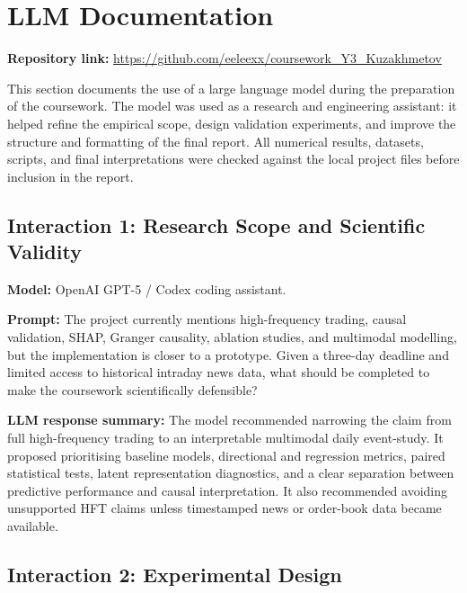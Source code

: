 \documentclass[12pt, a4paper]{article}
\begin{document}
\clearpage
\section*{LLM Documentation}

\textbf{Repository link:} \url{https://github.com/eeleexx/coursework_Y3_Kuzakhmetov}

\vspace{0.5cm}

This section documents the use of a large language model during the preparation of the coursework. The model was used as a research and engineering assistant: it helped refine the empirical scope, design validation experiments, and improve the structure and formatting of the final report. All numerical results, datasets, scripts, and final interpretations were checked against the local project files before inclusion in the report.

\subsection*{Interaction 1: Research Scope and Scientific Validity}

\textbf{Model:} OpenAI GPT-5 / Codex coding assistant.

\textbf{Prompt:} The project currently mentions high-frequency trading, causal validation, SHAP, Granger causality, ablation studies, and multimodal modelling, but the implementation is closer to a prototype. Given a three-day deadline and limited access to historical intraday news data, what should be completed to make the coursework scientifically defensible?

\textbf{LLM response summary:} The model recommended narrowing the claim from full high-frequency trading to an interpretable multimodal daily event-study. It proposed prioritising baseline models, directional and regression metrics, paired statistical tests, latent representation diagnostics, and a clear separation between predictive performance and causal interpretation. It also recommended avoiding unsupported HFT claims unless timestamped news or order-book data became available.

\subsection*{Interaction 2: Experimental Design}
\end{document}
